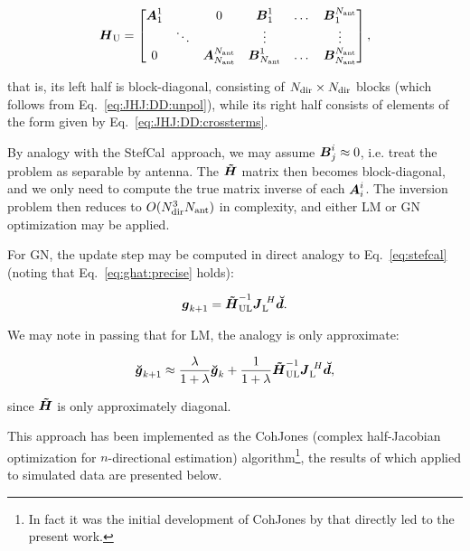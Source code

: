 \documentclass[useAMS,usenatbib]{mn2e}
\makeatletter
\newcommand{\mat}[1]{{\bmath{#1}}}
\newcommand{\JJ}{\mat{J}} %
\newcommand{\HH}{\mat{H}} %
\newcommand{\HHa}{\mat{\tilde{H}}} %
\newcommand{\Matrix}[2]{\left [ \begin{array}{@{}#1@{}}#2\end{array} \right ]}
\newcommand{\AUG}[1]{\bmath{\breve{#1}}}
\newcommand{\Gg}{\AUG{g}}
\newcommand{\Dd}{\AUG{d}}
\newcommand{\TOP}{\mathrm{U}}%
\newcommand{\LEFT}{\mathrm{L}}
\newcommand{\UL}{\mathrm{UL}}%
\newcommand{\StefCal}{{\sc StefCal}}
\makeatother
\begin{document}
\newcommand{\JJX}{\bmath{A}}
\newcommand{\JJY}{\bmath{B}}

\begin{equation}
\label{eq:JHJ:DD:blocked-ant}
\HH_\TOP = \Matrix{cccccc}{\JJX^1_1 &  & 0 & \JJY^1_1 & \dots & \JJY^{\Na}_1 \\
 & \ddots &  & \vdots & & \vdots \\
0 &  & \JJX_{\Na}^{\Na} & \JJY_{\Na}^1 & \dots & \JJY_{\Na}^{\Na} },
\end{equation}

that is, its left half is block-diagonal, consisting of $N_\mathrm{dir}\times N_\mathrm{dir}$ blocks (which follows
from Eq.~\ref{eq:JHJ:DD:unpol}), while its right half consists of elements of the form given by
Eq.~\ref{eq:JHJ:DD:crossterms}. 

By analogy with the \StefCal\ approach, we may assume $\JJY^i_j \approx 0$, i.e. treat the problem as
separable by antenna. The $\HHa$ matrix then becomes block-diagonal, and we only need to compute the 
true matrix inverse of each $\JJX^i_i$. The inversion problem then reduces to $O(N_\mathrm{dir}^3N_\mathrm{ant})$ in complexity,
and either LM or GN optimization may be applied.

For GN, the update step may be computed in direct analogy to Eq.~\ref{eq:stefcal} (noting that Eq.~\ref{eq:ghat:precise}
holds):

\[
\bmath{g}_{k+1} = \HHa_\UL^{-1} \JJ_\LEFT^{~H} \Dd.
\]

We may note in passing that for LM, the analogy is only approximate:

\[
\Gg_{k+1} \approx \frac{\lambda}{1+\lambda}\Gg_k + \frac{1}{1+\lambda} \HHa_\UL^{-1} \JJ_\LEFT^{~H} \Dd,
\]

since $\HHa$ is only approximately diagonal.

This approach has been implemented as the {\sc CohJones} (complex half-Jacobian optimization for $n$-directional estimation) 
algorithm\footnote{In fact it was the initial development of {\sc CohJones} by \citet{Tasse-cohjones} that directly led to the
present work.}, the results of which applied to simulated data are presented below.

\end{document}
